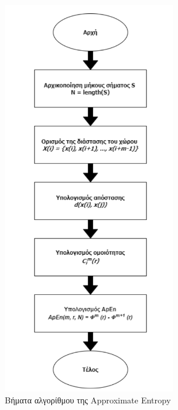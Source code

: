 \begin{figure}[H]
	\centering
	\includegraphics{ApEn.png}    
	\caption{Βήματα αλγορίθμου της \en Approximate Entropy \gr }
\end{figure}

